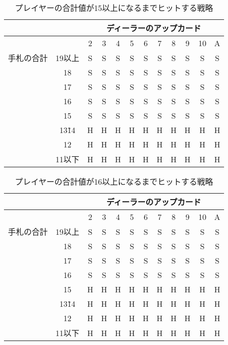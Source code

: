 \begin{table}[!hp]
  \centering
  \caption{プレイヤーの合計値が15以上になるまでヒットする戦略\label{hitleq15}}
  \begin{tabular}{|c|c|c|c|c|c|c|c|c|c|c|c|}
    \hline
    \multicolumn{2}{|c|}{} & \multicolumn{10}{|c|}{ディーラーのアップカード} \\ \hline
    \multicolumn{2}{|c|}{} & 2 & 3 & 4 & 5 & 6 & 7 & 8 & 9 & 10 & A \\ \hline
    手札の合計 & 19以上 & S & S & S & S & S & S & S & S & S & S \\ \cline{3-12}
              & 18 & S & S & S & S & S & S & S & S & S & S \\ \cline{3-12}
              & 17 & S & S & S & S & S & S & S & S & S & S \\ \cline{3-12}
              & 16 & S & S & S & S & S & S & S & S & S & S \\ \cline{3-12}
              & 15 & S & S & S & S & S & S & S & S & S & S \\ \cline{3-12}
              & 13\~ 14 & H & H & H & H & H & H & H & H & H & H \\ \cline{3-12}
              & 12 & H & H & H & H & H & H & H & H & H & H \\ \cline{3-12}
              & 11以下 & H & H & H & H & H & H & H & H & H & H \\ \hline
  \end{tabular}
\end{table}

\begin{table}[p]
  \centering
  \caption{プレイヤーの合計値が16以上になるまでヒットする戦略\label{hitleq16}}
  \begin{tabular}{|c|c|c|c|c|c|c|c|c|c|c|c|}
    \hline
    \multicolumn{2}{|c|}{} & \multicolumn{10}{|c|}{ディーラーのアップカード} \\ \hline
    \multicolumn{2}{|c|}{} & 2 & 3 & 4 & 5 & 6 & 7 & 8 & 9 & 10 & A \\ \hline
    手札の合計 & 19以上 & S & S & S & S & S & S & S & S & S & S \\ \cline{3-12}
              & 18 & S & S & S & S & S & S & S & S & S & S \\ \cline{3-12}
              & 17 & S & S & S & S & S & S & S & S & S & S \\ \cline{3-12}
              & 16 & S & S & S & S & S & S & S & S & S & S \\ \cline{3-12}
              & 15 & H & H & H & H & H & H & H & H & H & H \\ \cline{3-12}
              & 13\~ 14 & H & H & H & H & H & H & H & H & H & H \\ \cline{3-12}
              & 12 & H & H & H & H & H & H & H & H & H & H \\ \cline{3-12}
              & 11以下 & H & H & H & H & H & H & H & H & H & H \\ \hline
  \end{tabular}
\end{table}

